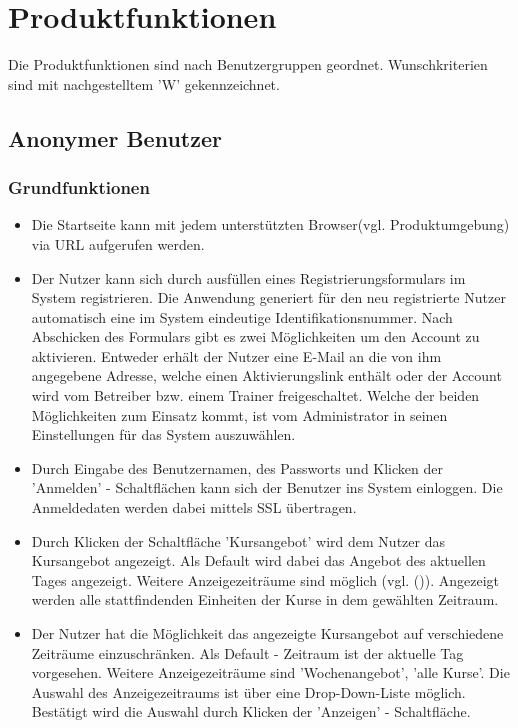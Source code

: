 \documentclass[a4paper]{scrreprt}
\begin{document}
\chapter{Produktfunktionen}
Die Produktfunktionen sind nach Benutzergruppen geordnet. Wunschkriterien sind mit nachgestelltem 'W' gekennzeichnet.

\section{Anonymer Benutzer}
\subsection{Grundfunktionen}
\begin{itemize}
	\item {}
	Die Startseite kann mit jedem unterstützten Browser(vgl. Produktumgebung) via URL aufgerufen werden.
	\item {}
	Der Nutzer kann sich durch ausfüllen eines Registrierungsformulars im System registrieren. Die Anwendung generiert für den neu registrierte Nutzer automatisch eine im System eindeutige Identifikationsnummer. Nach Abschicken des Formulars gibt es zwei Möglichkeiten um den Account zu aktivieren. Entweder erhält der Nutzer eine E-Mail an die von ihm angegebene Adresse, welche einen Aktivierungslink enthält oder der Account wird vom Betreiber bzw. einem Trainer freigeschaltet. Welche der beiden Möglichkeiten zum Einsatz kommt, ist vom Administrator in seinen Einstellungen für das System auszuwählen.
	\item {}
	Durch Eingabe des Benutzernamen, des Passworts und Klicken der 'Anmelden' - Schaltflächen kann sich der Benutzer ins System einloggen. Die Anmeldedaten werden dabei mittels SSL übertragen.
	\item {}
	Durch Klicken der Schaltfläche 'Kursangebot' wird dem Nutzer das Kursangebot angezeigt. Als Default wird dabei das Angebot des aktuellen Tages angezeigt. Weitere Anzeigezeiträume sind möglich (vgl. ()). Angezeigt werden alle stattfindenden Einheiten der Kurse in dem gewählten Zeitraum.
	\item {}
	Der Nutzer hat die Möglichkeit das angezeigte Kursangebot auf verschiedene Zeiträume einzuschränken. Als Default - Zeitraum ist der aktuelle Tag vorgesehen. Weitere Anzeigezeiträume sind 'Wochenangebot', 'alle Kurse'. Die Auswahl des Anzeigezeitraums ist über eine Drop-Down-Liste möglich. Bestätigt wird die Auswahl durch Klicken der 'Anzeigen' - Schaltfläche.

\end{itemize}
\end{document}
